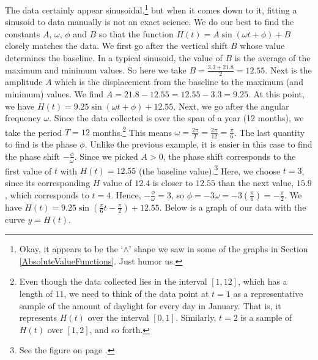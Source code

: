 \begin{ex}
\begin{enumerate}
\begin{center}
\end{center}

\vspace*{-.15in}

The data certainly appear sinusoidal,\footnote{Okay, it appears to be the `$\wedge$' shape we saw in some of the graphs in Section \ref{AbsoluteValueFunctions}.  Just humor us.} but when it comes down to it, fitting a sinusoid to data manually is not an exact science.  We do our best to find the constants $A$, $\omega$, $\phi$ and $B$ so that the function $H(t) = A\sin(\omega t + \phi) + B$ closely matches the data.  We first go after the vertical shift $B$ whose value determines the baseline.  In a typical sinusoid, the value of $B$ is the average of the maximum and minimum values.  So here we take $B = \frac{3.3+21.8}{2} = 12.55$.  Next is the amplitude $A$ which is the displacement from the baseline to the maximum (and minimum) values.  We find $A = 21.8 - 12.55 = 12.55 - 3.3 = 9.25$.  At this point, we have $H(t) = 9.25\sin(\omega t + \phi) + 12.55$.  Next, we go after the angular frequency $\omega$.  Since the data collected is over the span of a year (12 months), we take the period $T = 12$ months.\footnote{Even though the data collected lies in the interval $[1,12]$, which has a length of $11$, we need to think of the data point at $t=1$ as a representative sample of the amount of daylight for every day in January. That is, it represents $H(t)$ over the interval $[0,1]$.  Similarly, $t=2$ is a sample of $H(t)$ over $[1,2]$, and so forth.}   This means $\omega = \frac{2\pi}{T} = \frac{2\pi}{12} = \frac{\pi}{6}$.  The last quantity to find is the phase $\phi$. Unlike the previous example,  it is easier in this case to find the phase shift $-\frac{\phi}{\omega}$.  Since we picked $A > 0$, the phase shift corresponds to the first value of $t$ with $H(t) = 12.55$ (the baseline value).\footnote{See the figure on page \pageref{genericsinsuoidfigure}.}  Here, we choose $t = 3$, since its corresponding $H$ value of $12.4$ is closer to  $12.55$ than the next value, $15.9$, which corresponds to $t=4$.  Hence, $-\frac{\phi}{\omega} = 3$, so $\phi = -3 \omega = -3 \left(\frac{\pi}{6}\right) = -\frac{\pi}{2}$.  We have $H(t) = 9.25 \sin\left(\frac{\pi}{6} t - \frac{\pi}{2}\right) + 12.55$. Below is a graph of our data with the curve $y = H(t)$.


\begin{center}


\end{center}
\end{enumerate}
\end{ex}
